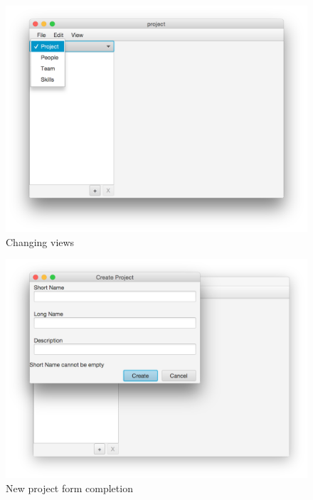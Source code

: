 \begin{figure}[H]
\centering
\includegraphics[width=\textwidth]{images/screenshots/screenshot3.png}
\caption{Changing views}
\label{fig:change_view}
\end{figure}

\begin{figure}[H]
\centering
\includegraphics[width=\textwidth]{images/screenshots/screenshot4.png}
\caption{New project form completion}
\label{fig:new_project_form}
\end{figure}